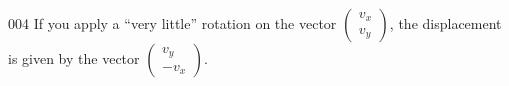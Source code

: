\begin{corrige}{004}
If you apply a ``very little'' rotation on the vector 
$
\begin{pmatrix}
v_x\\v_y
\end{pmatrix}$, the displacement is given by the vector $\begin{pmatrix}
v_y\\-v_x
\end{pmatrix}$.


\end{corrige}

